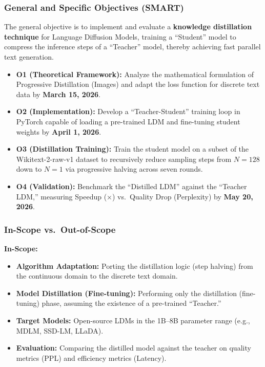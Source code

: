 \documentclass[11pt, a4paper]{article}
\begin{document}
\subsubsection*{General and Specific Objectives (SMART)}
The general objective is to implement and evaluate a \textbf{knowledge distillation technique} for Language Diffusion Models, training a ``Student'' model to compress the inference steps of a ``Teacher'' model, thereby achieving fast parallel text generation.
\begin{itemize}
    \item \textbf{O1 (Theoretical Framework):} Analyze the mathematical formulation of Progressive Distillation (Images) and adapt the loss function for discrete text data by \textbf{March 15, 2026}.
    \item \textbf{O2 (Implementation):} Develop a ``Teacher-Student'' training loop in PyTorch capable of loading a pre-trained LDM and fine-tuning student weights by \textbf{April 1, 2026}.
    \item \textbf{O3 (Distillation Training):} Train the student model on a subset of the Wikitext-2-raw-v1 dataset to recursively reduce sampling steps from $N=128$ down to $N=1$ via progressive halving across seven rounds.
    \item \textbf{O4 (Validation):} Benchmark the ``Distilled LDM'' against the ``Teacher LDM,'' measuring Speedup (×) vs.\ Quality Drop (Perplexity) by \textbf{May 20, 2026}.
\end{itemize}

\subsubsection*{In-Scope vs.\ Out-of-Scope}
\textbf{In-Scope:}
\begin{itemize}
    \item \textbf{Algorithm Adaptation:} Porting the distillation logic (step halving) from the continuous domain to the discrete text domain.
    \item \textbf{Model Distillation (Fine-tuning):} Performing only the distillation (fine-tuning) phase, assuming the existence of a pre-trained ``Teacher.''
    \item \textbf{Target Models:} Open-source LDMs in the 1B--8B parameter range (e.g., MDLM, SSD-LM, LLaDA).
    \item \textbf{Evaluation:} Comparing the distilled model against the teacher on quality metrics (PPL) and efficiency metrics (Latency).
\end{itemize}
\end{document}
